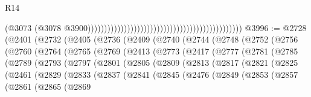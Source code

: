 \begin{lexlean}{R14}
\begin{coremodule}
                                                                                              (@3073
                                                                                                (@3078
                                                                                                  @3900)))))))))))))))))))))))))))))))))))))))))))))))
@3996 := @2728
    (@2401
      (@2732
        (@2405
          (@2736
            (@2409
              (@2740
                (@2744
                  (@2748
                    (@2752
                      (@2756
                        (@2760
                          (@2764
                            (@2765
                              (@2769
                                (@2413
                                  (@2773
                                    (@2417
                                      (@2777
                                        (@2781
                                          (@2785
                                            (@2789
                                              (@2793
                                                (@2797
                                                  (@2801
                                                    (@2805
                                                      (@2809
                                                        (@2813
                                                          (@2817
                                                            (@2821
                                                              (@2825
                                                                (@2461
                                                                  (@2829
                                                                    (@2833
                                                                      (@2837
                                                                        (@2841
                                                                          (@2845
                                                                            (@2476
                                                                              (@2849
                                                                                (@2853
                                                                                  (@2857
                                                                                    (@2861
                                                                                      (@2865
                                                                                        (@2869

\end{coremodule}
\end{lexlean}
